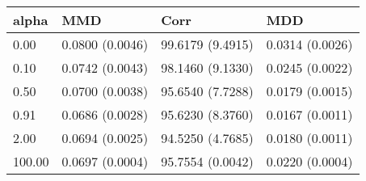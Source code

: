 \begin{tabular}{llll}
\toprule
alpha & MMD & Corr & MDD \\
\midrule
0.00 & 0.0800 (0.0046) & 99.6179 (9.4915) & 0.0314 (0.0026) \\
0.10 & 0.0742 (0.0043) & 98.1460 (9.1330) & 0.0245 (0.0022) \\
0.50 & 0.0700 (0.0038) & 95.6540 (7.7288) & 0.0179 (0.0015) \\
0.91 & 0.0686 (0.0028) & 95.6230 (8.3760) & 0.0167 (0.0011) \\
2.00 & 0.0694 (0.0025) & 94.5250 (4.7685) & 0.0180 (0.0011) \\
100.00 & 0.0697 (0.0004) & 95.7554 (0.0042) & 0.0220 (0.0004) \\
\bottomrule
\end{tabular}
